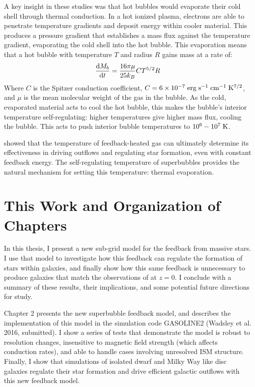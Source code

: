 A key insight in these studies was that hot bubbles would evaporate their cold
shell through thermal conduction.  In a hot ionized plasma, electrons are able
to penetrate temperature gradients and deposit energy within cooler material.
This produces a pressure gradient that establishes a mass flux against the
temperature gradient, evaporating the cold shell into the hot bubble.  This
evaporation means that a hot bubble with temperature $T$ and radius $R$ gains
mass at a rate of:
\begin{equation}
    \frac{{\rm d }M_b}{{\rm d}t} = \frac{16\pi\mu}{25k_B} CT^{5/2}R
\end{equation}
Where $C$ is the Spitzer conduction coefficient,
$C=6\times10^{-7}\;\rm{erg\;s^{-1}\;cm^{-1}\;K^{7/2}}$, and $\mu$ is the mean
molecular weight of the gas in the bubble.  As the cold, evaporated material
acts to cool the hot bubble, this makes the bubble's interior temperature
self-regulating: higher temperatures give higher mass flux, cooling the bubble.
This acts to push interior bubble temperatures to $10^6-10^7\;\rm{K}$.

\citet{DallaVecchia2012} showed that the temperature of feedback-heated gas can
ultimately determine its effectiveness in driving outflows and regulating star
formation, even with constant feedback energy.  The self-regulating temperature
of superbubbles provides the natural mechanism for setting this temperature:
thermal evaporation.

\section{This Work and Organization of Chapters}
In this thesis, I present a new sub-grid model for the feedback from massive
stars.  I use that model to investigate how this feedback can regulate the
formation of stars within galaxies, and finally show how this same feedback is
unnecessary to produce galaxies that match the observations of
\citet{McGaugh2016} at $z=0$.  I conclude with a summary of these results, their
implications, and some potential future directions for study.

Chapter 2 presents the new superbubble feedback model, and describes the
implementation of this model in the simulation code {\sc GASOLINE2} (Wadsley et
al. 2016, submitted).  I show a series of tests that demonstrate the model is
robust to resolution changes, insensitive to magnetic field strength (which
affects conduction rates), and able to handle cases involving unresolved ISM
structure.  Finally, I show that simulations of isolated dwarf and Milky Way
like disc galaxies regulate their star formation and drive efficient galactic
outflows with this new feedback model.

